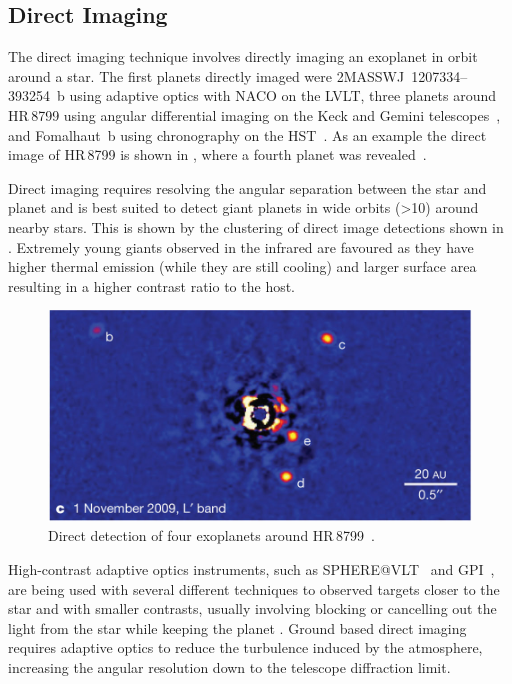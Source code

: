 \subsection{Direct Imaging}
\label{sub:direct_detection}
The direct imaging technique involves directly imaging an exoplanet in orbit around a star.
The first planets directly imaged were {2MASSWJ~1207334--393254~b} using adaptive optics with NACO on the LVLT\citep{chauvin_giant_2004}, three planets around HR\,8799 using angular differential imaging on the Keck and Gemini telescopes~\citep{marois_direct_2008}, and {Fomalhaut~b} using chronography on the HST~\citep{kalas_optical_2008}.
As an example the direct image of {HR\,8799} is shown in , where a fourth planet was revealed~\citep{marois_images_2010}.

Direct imaging requires resolving the angular separation between the star and planet and is best suited to detect giant planets in wide orbits (>10\AU{}) around nearby stars. This is shown by the clustering of direct image detections shown in .
Extremely young giants observed in the infrared are favoured as they have higher thermal emission (while they are still cooling) and larger surface area resulting in a higher contrast ratio to the host.


\begin{figure}
    \centering
    \includegraphics[width=0.5\linewidth]{./figures/introduction/DirectImaging_HR8799_MaroisEtAl2010}
    \caption{Direct detection of four exoplanets around HR\,8799~\citep{marois_images_2010}.}
    \label{fig:directimaging}
\end{figure}

High-contrast adaptive optics instruments, such as SPHERE@VLT~\citet{beuzit_sphere_2008} and GPI~\citep{macintosh_gemini_2008}, are being used with several different techniques to observed targets closer to the star and with smaller contrasts, usually involving blocking or cancelling out the light from the star while keeping the planet \citep[e.g.][]{marois_direct_2005, mawet_annular_2005, schmid_zimpol_2005, sirbu_prospects_2017, sirbu_techniques_2017, wang_observing_2017}.
Ground based direct imaging requires adaptive optics to reduce the turbulence induced by the atmosphere, increasing the angular resolution down to the telescope diffraction limit.

